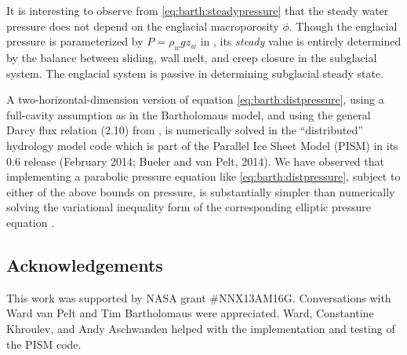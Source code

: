 \documentclass[review,letterpaper]{igs}
\begin{document}
It is interesting to observe from \eqref{eq:barth:steadypressure} that the steady water pressure does not depend on the englacial macroporosity $\phi$.  Though the englacial pressure is parameterized by $P=\rho_w g z_w$ in \cite{Bartholomausetal2011}, its \emph{steady} value is entirely determined by the balance between sliding, wall melt, and creep closure in the subglacial system.  The englacial system is passive in determining subglacial steady state.

A two-horizontal-dimension version of equation \eqref{eq:barth:distpressure}, using a full-cavity assumption as in the Bartholomaus model, and using the general Darcy flux relation (2.10) from \cite{Schoofetal2012}, is numerically solved in the ``distributed'' hydrology model code which is part of the Parallel Ice Sheet Model (PISM) in its 0.6 release (February 2014; Bueler and van Pelt, 2014)\nocite{BuelervanPeltDRAFT}.  We have observed that implementing a parabolic pressure equation like \eqref{eq:barth:distpressure}, subject to either of the above bounds on pressure, is substantially simpler than numerically solving the variational inequality form of the corresponding elliptic pressure equation \citep{Schoofetal2012}. 


\subsection*{Acknowledgements}  This work was supported by NASA grant \#NNX13AM16G.  Conversations with Ward van Pelt and Tim Bartholomaus were appreciated.  Ward, Constantine Khroulev, and Andy Aschwanden helped with the implementation and testing of the PISM code.



\end{document}
